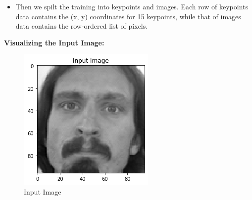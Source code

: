 \documentclass[conference]{IEEEtran}
\begin{document}
\begin{itemize}
    \item Then we spilt the training into keypoints and images. Each row of keypoints data contains the (x, y) coordinates for 15 keypoints, while that of images data contains the row-ordered list of pixels.
\end{itemize}


\textbf{Visualizing the Input Image:} 

\begin{figure}[h!]
    \centering
    \includegraphics[scale=0.8]{sample.png}
    \caption{Input Image}
    \label{fig:my_label}
\end{figure}
\end{document}
